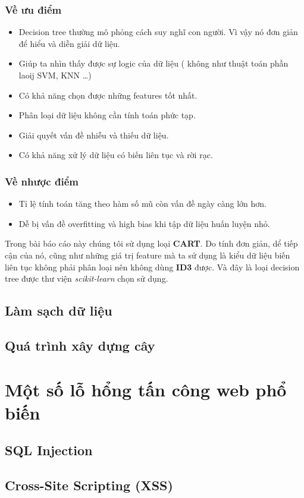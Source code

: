\documentclass[../main-report.tex]{subfiles}
\begin{document}
\subsubsection*{Về ưu điểm}
\begin{itemize}
\item Decision tree thường mô phỏng cách suy nghĩ con người. Vì vậy nó đơn giản để hiểu và diễn giải dữ liệu.
\item Giúp ta nhìn thấy được sự logic của dữ liệu ( không như thuật toán phần laoij SVM, KNN …)
\item Có khả năng chọn được những features tốt nhất.
\item Phân loại dữ liệu không cần tính toán phức tạp.
\item Giải quyết vấn đề nhiễu và thiếu dữ liệu.
\item Có khả năng xử lý dữ liệu có biến liên tục và rời rạc.
\end{itemize}

\subsubsection*{Về nhược điểm}
\begin{itemize}
\item Tỉ lệ tính toán tăng theo hàm số mũ còn vấn đề ngày càng lớn hơn.
\item Dễ bị vấn đề overfitting và high bias khi tập dữ liệu huấn luyện nhỏ.
\end{itemize}

Trong bài báo cáo này chúng tôi sử dụng loại \textbf{CART}. Do tính đơn giản, dể tiếp cận của nó, cũng như những giá trị feature mà ta sử dụng là kiểu dữ liệu biến liên tục không phải phân loại nên không dùng \textbf{ID3} được. Và đây là loại decision tree được thư viện \textit{scikit-learn} chọn sử dụng.
\subsection{Làm sạch dữ liệu}

\subsection{Quá trình xây dựng cây}

\section[Một số lỗ hổng web]{Một số lỗ hổng tấn công web phổ biến}
\subsection{SQL Injection}

\subsection{Cross-Site Scripting (XSS)}
\end{document}
